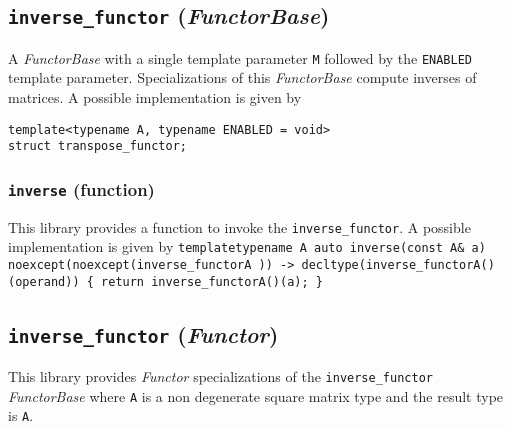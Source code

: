 \subsection{\texttt{inverse\_functor} (\textit{FunctorBase})}
A \textit{FunctorBase} with a single template parameter \texttt{M} followed by the \texttt{ENABLED} template parameter.
Specializations of this \textit{FunctorBase} compute inverses of matrices.
A possible implementation is given by
\begin{verbatim}
template<typename A, typename ENABLED = void>
struct transpose_functor;
\end{verbatim}

\subsubsection{\texttt{inverse} (function)}
This library provides a function to invoke the \texttt{inverse\_functor}.
A possible implementation is given by\newline
\texttt{template\textlangle typename A\textrangle\newline
auto\newline
inverse(const A\& a)\newline
noexcept(noexcept(inverse\_functor\textlangle A \textrangle))\newline
-> decltype(inverse\_functor\textlangle A\textrangle()(operand))\newline
\{ return inverse\_functor\textlangle A\textrangle()(a); \}}

\subsection{\texttt{inverse\_functor} (\textit{Functor})}
This library provides \textit{Functor} specializations of the \texttt{inverse\_functor} \textit{FunctorBase}
where \texttt{A} is a non degenerate square matrix type and the result type is \texttt{A}.
